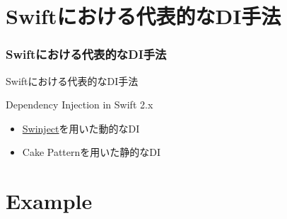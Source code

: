 \section{Swiftにおける代表的なDI手法}

\begin{frame}
  \frametitle{Swiftにおける代表的なDI手法}

  \pause

  \begin{exampleblock}{Swiftにおける代表的なDI手法}
    \begin{shadequote}[r]{\scriptsize Dependency Injection in Swift 2.x\cite{di-swift2}}
      \begin{itemize}
        \item<3-> \href{https://github.com/Swinject/Swinject}{Swinject}を用いた動的なDI
        \item<4-> Cake Patternを用いた静的なDI
      \end{itemize}
    \end{shadequote}
  \end{exampleblock}

  \begin{center}

  \end{center}
\end{frame}

\section{Example}

